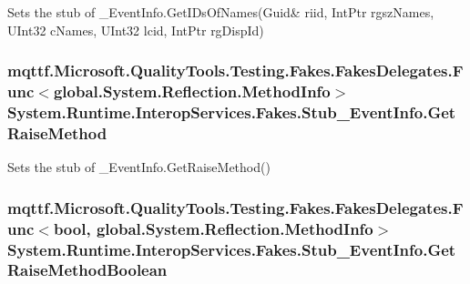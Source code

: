 Sets the stub of \-\_\-\-Event\-Info.\-Get\-I\-Ds\-Of\-Names(Guid\& riid, Int\-Ptr rgsz\-Names, U\-Int32 c\-Names, U\-Int32 lcid, Int\-Ptr rg\-Disp\-Id)

\hypertarget{class_system_1_1_runtime_1_1_interop_services_1_1_fakes_1_1_stub___event_info_a8f8a64c86ebc07d40342ba9ed4182947}{
\subsubsection[{Get\-Raise\-Method}]{\setlength{\rightskip}{0pt plus 5cm}mqttf.\-Microsoft.\-Quality\-Tools.\-Testing.\-Fakes.\-Fakes\-Delegates.\-Func$<$global.\-System.\-Reflection.\-Method\-Info$>$ System.\-Runtime.\-Interop\-Services.\-Fakes.\-Stub\-\_\-\-Event\-Info.\-Get\-Raise\-Method}}\label{class_system_1_1_runtime_1_1_interop_services_1_1_fakes_1_1_stub___event_info_a8f8a64c86ebc07d40342ba9ed4182947}


Sets the stub of \-\_\-\-Event\-Info.\-Get\-Raise\-Method()

\hypertarget{class_system_1_1_runtime_1_1_interop_services_1_1_fakes_1_1_stub___event_info_aa303b13e58826e816292841c7c1f5cdb}{
\subsubsection[{Get\-Raise\-Method\-Boolean}]{\setlength{\rightskip}{0pt plus 5cm}mqttf.\-Microsoft.\-Quality\-Tools.\-Testing.\-Fakes.\-Fakes\-Delegates.\-Func$<$bool, global.\-System.\-Reflection.\-Method\-Info$>$ System.\-Runtime.\-Interop\-Services.\-Fakes.\-Stub\-\_\-\-Event\-Info.\-Get\-Raise\-Method\-Boolean}}\label{class_system_1_1_runtime_1_1_interop_services_1_1_fakes_1_1_stub___event_info_aa303b13e58826e816292841c7c1f5cdb}


